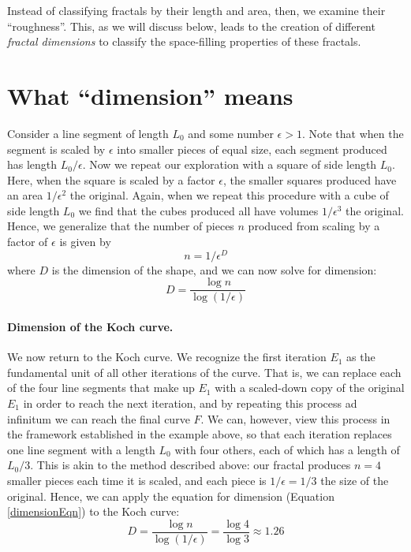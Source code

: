 Instead of classifying fractals by their length and area, then, we examine their ``roughness''. This, as we will discuss below, leads to the creation of different \textit{fractal dimensions} to classify the space-filling properties of these fractals.

\section{What ``dimension'' means}
Consider a line segment of length $ L_0 $ and some number $\epsilon > 1$. Note that when the segment is scaled by $\epsilon$ into smaller pieces of equal size, each segment produced has length $L_0/\epsilon$. Now we repeat our exploration with a square of side length $ L_0 $. Here, when the square is scaled by a factor $\epsilon$, the smaller squares produced have an area $1/\epsilon^2$ the original. Again, when we repeat this procedure with a cube of side length $ L_0 $ we find that the cubes produced all have volumes $1/\epsilon^3$ the original. Hence, we generalize that the number of pieces $n$ produced from scaling by a factor of $\epsilon$ is given by 
\begin{equation}
n = 1/\epsilon^D
\end{equation}
where $D$ is the dimension of the shape, and we can now solve for dimension:
\begin{equation}\label{dimensionEqn}
 D = \frac{\log{n}}{\log{(1/\epsilon)}}
\end{equation}

\paragraph{Dimension of the Koch curve.} We now return to the Koch curve. We recognize the first iteration $E_1$ as the fundamental unit of all other iterations of the curve. That is, we can replace each of the four line segments that make up $E_1$ with a scaled-down copy of the original $E_1$ in order to reach the next iteration, and by repeating this process ad infinitum we can reach the final curve $F$. We can, however, view this process in the framework established in the example above, so that each iteration replaces one line segment with a length $L_0$ with four others, each of which has a length of $L_0/3$. This is akin to the method described above: our fractal produces $n = 4$ smaller pieces each time it is scaled, and each piece is $1/\epsilon = 1/3$ the size of the original. Hence, we can apply the equation for dimension (Equation \ref{dimensionEqn}) to the Koch curve:
\begin{equation}
D = \frac{\log{n}}{\log{(1/\epsilon)}} = \frac{\log{4}}{\log{3}} \approx 1.26
\end{equation}

